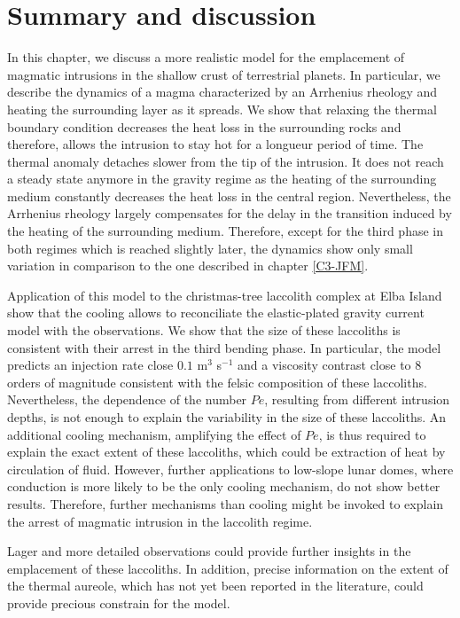 \section{Summary and discussion}
\label{sec:discussion}

In this chapter, we discuss a more realistic model for the emplacement
of magmatic intrusions in the shallow crust of terrestrial planets. In
particular, we  describe the dynamics  of a magma characterized  by an
Arrhenius rheology  and heating the  surrounding layer as  it spreads.
We show  that relaxing  the thermal  boundary condition  decreases the
heat loss in the surrounding rocks and therefore, allows the intrusion
to  stay hot  for  a longueur  period of  time.   The thermal  anomaly
detaches slower  from the tip of  the intrusion.  It does  not reach a
steady  state anymore  in the  gravity regime  as the  heating of  the
surrounding medium constantly  decreases the heat loss  in the central
region.  Nevertheless, the Arrhenius  rheology largely compensates for
the delay in the transition induced  by the heating of the surrounding
medium. Therefore, except for the third phase in both regimes which is
reached  slightly later,  the dynamics  show only  small variation  in
comparison to the one described in chapter \ref{C3-JFM}.

Application of this  model to the christmas-tree  laccolith complex at
Elba  Island  show  that  the   cooling  allows  to  reconciliate  the
elastic-plated gravity  current model with the  observations.  We show
that the size  of these laccoliths is consistent with  their arrest in
the  third  bending  phase.   In particular,  the  model  predicts  an
injection rate  close $0.1$  m$^3$ s$^{-1}$  and a  viscosity contrast
close  to  $8$   orders  of  magnitude  consistent   with  the  felsic
composition of these laccoliths.   Nevertheless, the dependence of the
number $Pe$, resulting from different  intrusion depths, is not enough
to  explain the  variability  in  the size  of  these laccoliths.   An
additional cooling mechanism,  amplifying the effect of  $Pe$, is thus
required to explain the exact  extent of these laccoliths, which could
be  extraction of  heat  by circulation  of  fluid.  However,  further
applications to low-slope lunar domes, where conduction is more likely
to  be  the  only  cooling  mechanism, do  not  show  better  results.
Therefore, further mechanisms than cooling might be invoked to explain
the arrest of magmatic intrusion in the laccolith regime.

Lager and more detailed observations could provide further insights in
the emplacement of these  laccoliths. In addition, precise information
on the extent of the thermal  aureole, which has not yet been reported
in the literature, could provide precious constrain for the model.




